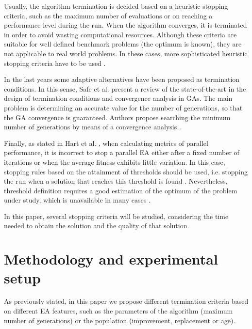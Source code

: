 \documentclass[runningheads,a4paper]{llncs}
\begin{document}
Usually, the algorithm termination is decided based on a heuristic stopping criteria, such as the maximum number of evaluations or on reaching a performance level during the run. 
When the algorithm converges, it is terminated in order to avoid wasting computational resources.
Although these criteria are suitable for well defined benchmark problems (the optimum is known), they are not applicable to real world problems. 
In these cases, more sophisticated heuristic stopping criteria have to be used \cite{NME2909,Wagner2010}.

In the last years some adaptive alternatives have been proposed  as termination conditions.
In this sense, Safe et al. \cite{Safe2004} present a review of the state-of-the-art in the design of termination conditions and convergence analysis in GAs.
The main problem is determining an accurate value for the number of generations, so that the GA convergence is guaranteed.
Authors propose searching the minimum number of generations by means of a convergence analysis \cite{Rudolph1994}.


Finally, as stated in Hart et al. \cite{Hart1996}, when calculating metrics of parallel performance, it is incorrect to stop a parallel EA either after a fixed number of iterations or when the average fitness exhibits little variation. In this case, stopping rules based on the attainment of thresholds should be used, i.e. stopping the run when a solution that reaches this threshold is found \cite{Sena2001}. Nevertheless, threshold definition requires a good estimation of the optimum of the problem under study, which is unavailable in many cases \cite{Safe2004}.

In this paper, several stopping criteria will be studied, considering the time needed to obtain the solution and the quality of that solution. 


%
%
\section{Methodology and experimental setup}
\label{sec:met}

As previously stated, in this paper we propose different termination criteria based on different EA features, such as the parameters of the algorithm (maximum number of generations) or the population (improvement, replacement or age). 
\end{document}
